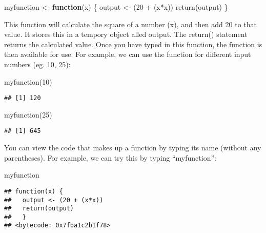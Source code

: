 \documentclass[
]{book}
\newenvironment{Shaded}{\begin{snugshade}}{\end{snugshade}}
\newcommand{\ControlFlowTok}[1]{\textcolor[rgb]{0.13,0.29,0.53}{\textbf{#1}}}
\newcommand{\DecValTok}[1]{\textcolor[rgb]{0.00,0.00,0.81}{#1}}
\newcommand{\FunctionTok}[1]{\textcolor[rgb]{0.00,0.00,0.00}{#1}}
\newcommand{\NormalTok}[1]{#1}
\newcommand{\OtherTok}[1]{\textcolor[rgb]{0.56,0.35,0.01}{#1}}
\newcommand{\SpecialCharTok}[1]{\textcolor[rgb]{0.00,0.00,0.00}{#1}}
\begin{document}
\begin{Shaded}
\begin{Highlighting}[]
\NormalTok{myfunction }\OtherTok{\textless{}{-}} \ControlFlowTok{function}\NormalTok{(x) \{ }
\NormalTok{  output }\OtherTok{\textless{}{-}}\NormalTok{ (}\DecValTok{20} \SpecialCharTok{+}\NormalTok{ (x}\SpecialCharTok{*}\NormalTok{x)) }
  \FunctionTok{return}\NormalTok{(output)}
\NormalTok{  \}}
\end{Highlighting}
\end{Shaded}

This function will calculate the square of a number (x), and then add 20 to that value. It stores this in a tempory object alled output. The return() statement returns the calculated value. Once you have typed in this function, the function is then available for use. For example, we can use the function for different input numbers (eg. 10, 25):

\begin{Shaded}
\begin{Highlighting}[]
\FunctionTok{myfunction}\NormalTok{(}\DecValTok{10}\NormalTok{)}
\end{Highlighting}
\end{Shaded}

\begin{verbatim}
## [1] 120
\end{verbatim}

\begin{Shaded}
\begin{Highlighting}[]
\FunctionTok{myfunction}\NormalTok{(}\DecValTok{25}\NormalTok{)}
\end{Highlighting}
\end{Shaded}

\begin{verbatim}
## [1] 645
\end{verbatim}

You can view the code that makes up a function by typing its name (without any parentheses). For example, we can try this by typing ``myfunction'':

\begin{Shaded}
\begin{Highlighting}[]
\NormalTok{myfunction}
\end{Highlighting}
\end{Shaded}

\begin{verbatim}
## function(x) { 
##   output <- (20 + (x*x)) 
##   return(output)
##   }
## <bytecode: 0x7fba1c2b1f78>
\end{verbatim}
\end{document}
